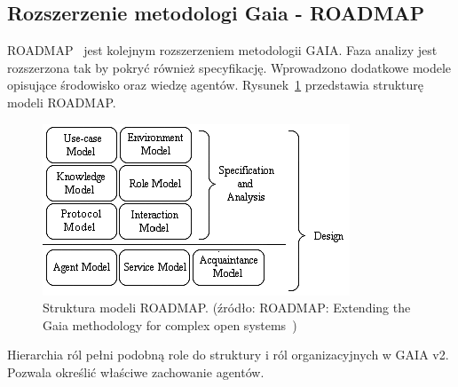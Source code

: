 \documentclass[11pt]{report}
\begin{document}
    \subsection{Rozszerzenie metodologi Gaia - ROADMAP}
    ROADMAP~\cite{Juan2002a} jest kolejnym rozszerzeniem metodologii GAIA\@.
    Faza analizy jest rozszerzona tak by pokryć również specyfikację.
    Wprowadzono dodatkowe modele opisujące środowisko oraz wiedzę agentów.
    Rysunek~\ref{fig:roadmap} przedstawia strukturę modeli ROADMAP\@.
    \begin{figure}[!ht]
        \centering
        \includegraphics[width=\linewidth]{fig/roadmap models.png}
        \caption{Struktura modeli ROADMAP. (źródło: ROADMAP: Extending the Gaia methodology for complex open systems~\cite{Juan2002a})}
        \label{fig:roadmap}
    \end{figure}
    Hierarchia ról pełni podobną role do struktury i ról organizacyjnych w GAIA v2.
    Pozwala określić właściwe zachowanie agentów.
\end{document}

